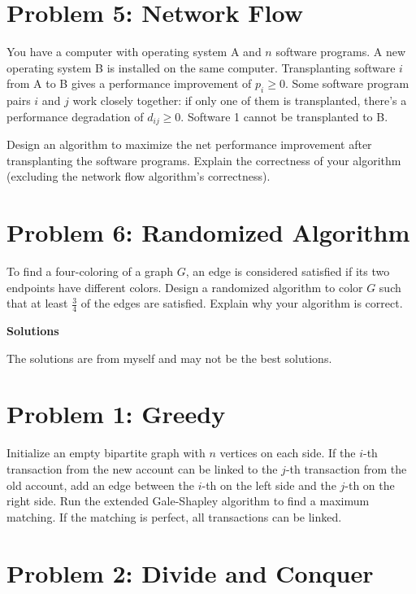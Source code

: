 \documentclass[a4paper,12pt]{article}
\begin{document}
\section*{Problem 5: Network Flow}

You have a computer with operating system A and $n$ software programs. A new operating system B is installed on the same computer. Transplanting software $i$ from A to B gives a performance improvement of $p_i \geq 0$. Some software program pairs $i$ and $j$ work closely together: if only one of them is transplanted, there's a performance degradation of $d_{ij} \geq 0$. Software 1 cannot be transplanted to B.

Design an algorithm to maximize the net performance improvement after transplanting the software programs. Explain the correctness of your algorithm (excluding the network flow algorithm's correctness).

\section*{Problem 6: Randomized Algorithm}

To find a four-coloring of a graph $G$, an edge is considered satisfied if its two endpoints have different colors. Design a randomized algorithm to color $G$ such that at least $\frac{3}{4}$ of the edges are satisfied. Explain why your algorithm is correct.

\newpage

\begin{center}
  {\Large \bf Solutions}
\end{center}

The solutions are from myself and may not be the best solutions.

\section*{Problem 1: Greedy}

Initialize an empty bipartite graph with $n$ vertices on each side. If the $i$-th transaction from the new account can be linked to the $j$-th transaction from the old account, add an edge between the $i$-th on the left side and the $j$-th on the right side. Run the extended Gale-Shapley algorithm to find a maximum matching. If the matching is perfect, all transactions can be linked.

\section*{Problem 2: Divide and Conquer}
\end{document}

